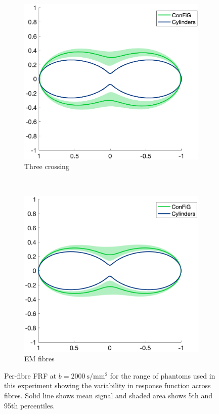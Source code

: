 \begin{figure}[h!]
  \begin{subfigure}[]{0.4\textwidth}
    \includegraphics[width=\textwidth]{figures/frf_experiment/threeperp_prctiles_b_2000.png}
    \caption{Three crossing}
  \end{subfigure}
  ~
  \begin{subfigure}[]{0.4\textwidth}
    \includegraphics[width=\textwidth]{figures/frf_experiment/EMfibres_prctiles_b_2000.png}
    \caption{\ac{EM} fibres}
  \end{subfigure}

  \caption{Per-fibre FRF at $b = \SI{2000}{\second\per\milli\metre\squared}$ for the range of phantoms used in this experiment showing the variability in response function across fibres. Solid line shows mean signal and shaded area shows 5th and 95th percentiles. }
  \label{fig:frf_prctiles_kappa_b2000}
\end{figure}

